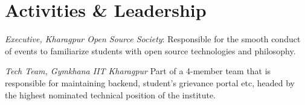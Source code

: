 \documentclass[]{deedy-resume-openfont}
\begin{document}
\begin{minipage}[t]{0.66\textwidth}

\section{Activities \& Leadership}

\vspace{\topsep} %
\begin{tightemize}


\item {\emph{Executive, Kharagpur Open Source Society}:} Responsible for the smooth conduct of events to familiarize students with open source technologies and philosophy.\\
\item{\emph{Tech Team, Gymkhana IIT Kharagpur}} Part of a 4-member team that is responsible for maintaining backend, student’s grievance portal etc, headed by the highest nominated technical position of the institute.

\end{tightemize}
\sectionsep

\end{minipage} 
\end{document}
